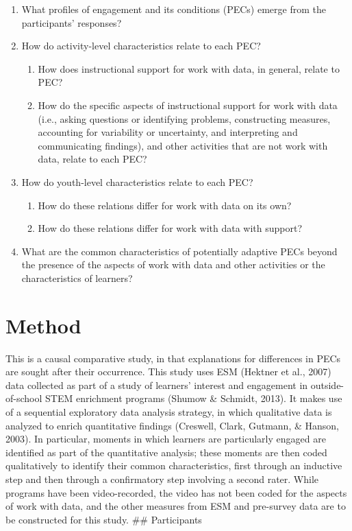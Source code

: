 \documentclass[]{msu-thesis}
\providecommand{\tightlist}{%
  \setlength{\itemsep}{0pt}\setlength{\parskip}{0pt}}
\theoremstyle{definition}
\theoremstyle{definition}
\theoremstyle{definition}
\theoremstyle{remark}
\begin{document}
\begin{enumerate}
\def\labelenumi{\arabic{enumi}.}
\tightlist
\item
  What profiles of engagement and its conditions (PECs) emerge from the
  participants' responses?
\item
  How do activity-level characteristics relate to each PEC?

  \begin{enumerate}
  \def\labelenumii{\arabic{enumii}.}
  \tightlist
  \item
    How does instructional support for work with data, in general,
    relate to PEC?
  \item
    How do the specific aspects of instructional support for work with
    data (i.e., asking questions or identifying problems, constructing
    measures, accounting for variability or uncertainty, and
    interpreting and communicating findings), and other activities that
    are not work with data, relate to each PEC?
  \end{enumerate}
\item
  How do youth-level characteristics relate to each PEC?

  \begin{enumerate}
  \def\labelenumii{\arabic{enumii}.}
  \tightlist
  \item
    How do these relations differ for work with data on its own?
  \item
    How do these relations differ for work with data with support?
  \end{enumerate}
\item
  What are the common characteristics of potentially adaptive PECs
  beyond the presence of the aspects of work with data and other
  activities or the characteristics of learners?
\end{enumerate}

\chapter{Method}\label{method}

This is a causal comparative study, in that explanations for differences
in PECs are sought after their occurrence. This study uses ESM (Hektner
et al., 2007) data collected as part of a study of learners' interest
and engagement in outside-of-school STEM enrichment programs (Shumow \&
Schmidt, 2013). It makes use of a sequential exploratory data analysis
strategy, in which qualitative data is analyzed to enrich quantitative
findings (Creswell, Clark, Gutmann, \& Hanson, 2003). In particular,
moments in which learners are particularly engaged are identified as
part of the quantitative analysis; these moments are then coded
qualitatively to identify their common characteristics, first through an
inductive step and then through a confirmatory step involving a second
rater. While programs have been video-recorded, the video has not been
coded for the aspects of work with data, and the other measures from ESM
and pre-survey data are to be constructed for this study. \#\#
Participants
\end{document}
